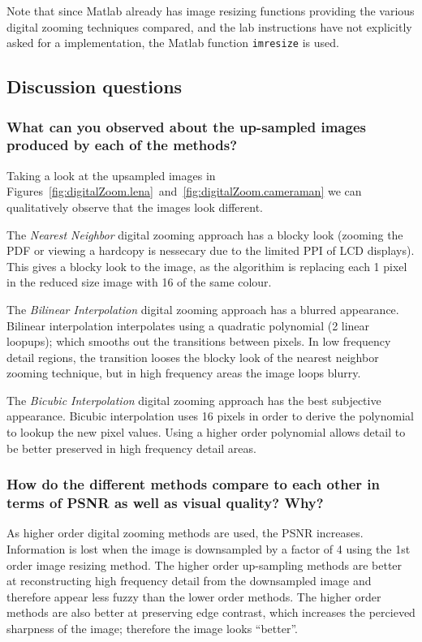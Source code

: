 \documentclass[article, 1.5space, letterpaper, 12pt, oneside, header, footer]{SydeClass}
\begin{document}
Note that since Matlab already has image resizing functions providing the various digital zooming techniques compared, and the lab instructions have not explicitly asked for a implementation, the Matlab function \texttt{imresize} is used.



\subsection{Discussion questions}

\subsubsection{What can you observed about the up-sampled images produced by each of the methods?}

Taking a look at the upsampled images in Figures~\ref{fig:digitalZoom.lena}~and~\ref{fig:digitalZoom.cameraman} we can qualitatively observe that the images look different.

The \emph{Nearest Neighbor} digital zooming approach has a blocky look (zooming the PDF or viewing a hardcopy is nessecary due to the limited PPI of LCD displays). This gives a blocky look to the image, as the algorithim is replacing each 1 pixel in the reduced size image with 16 of the same colour.

The \emph{Bilinear Interpolation} digital zooming approach has a blurred appearance. Bilinear interpolation interpolates using a quadratic polynomial (2 linear loopups); which smooths out the transitions between pixels. In low frequency detail regions, the transition looses the blocky look of the nearest neighbor zooming technique, but in high frequency areas the image loops blurry.

The \emph{Bicubic Interpolation} digital zooming approach has the best subjective appearance. Bicubic interpolation uses 16 pixels in order to derive the polynomial to lookup the new pixel values. Using a higher order polynomial allows detail to be better preserved in high frequency detail areas.

\subsubsection{How do the different methods compare to each other in terms of PSNR as well as visual quality? Why?}

As higher order digital zooming methods are used, the PSNR increases. Information is lost when the image is downsampled by a factor of 4 using the 1st order image resizing method. The higher order up-sampling methods are better at reconstructing high frequency detail from the downsampled image and therefore appear less fuzzy than the lower order methods. The higher order methods are also better at preserving edge contrast, which increases the percieved sharpness of the image; therefore the image looks ``better''.
\end{document}
